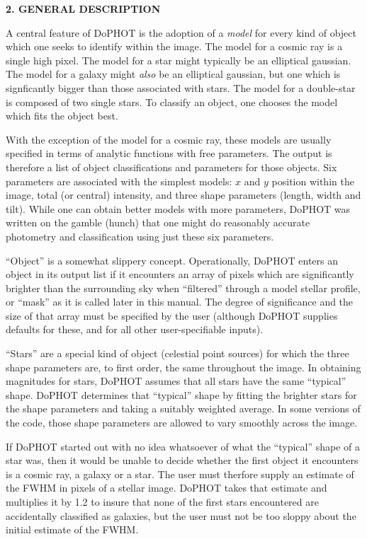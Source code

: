 \centerline{\bf 2.  GENERAL DESCRIPTION}

A central feature of DoPHOT is the adoption of a {\it
model} for every kind of object which one seeks to identify
within the image.  The model for a cosmic ray is a single
high pixel.  The model for a star might typically be an
elliptical gaussian.  The model for a galaxy might {\it
also} be an elliptical gaussian, but one which is
signficantly bigger than those associated with stars.  The
model for a double-star is composed of two single stars.  To
classify an object, one chooses the model which fits the
object best.

With the exception of the model for a cosmic ray, these
models are usually specified in terms of analytic functions with
free parameters.  The output is
therefore a list of object classifications and parameters
for those objects.  Six parameters are associated with the
simplest models: $x$ and $y$ position within the image, total
(or central) intensity, and three shape parameters (length,
width and tilt).  While one can obtain better models with
more parameters, DoPHOT was written on the gamble (hunch)
that one might do reasonably accurate photometry and
classification using just these six parameters.

``Object'' is a somewhat slippery concept.  Operationally,
DoPHOT enters an object in its output list if it encounters
an array of pixels which are significantly brighter than the
surrounding sky when ``filtered'' through a model stellar
profile, or ``mask'' as it is called later in this manual.
The degree of significance and the size of that
array must be specified by the user (although DoPHOT
supplies defaults for these, and for all other user-specifiable inputs).

``Stars'' are a special kind of object (celestial point
sources) for which the three shape parameters are, to first
order, the same throughout the image.  In obtaining
magnitudes for stars, DoPHOT assumes that all stars have the
same ``typical'' shape.  DoPHOT determines that ``typical''
shape by fitting the brighter stars for the shape parameters
and taking a suitably weighted average.  In some versions of the code,
those shape parameters are allowed to vary smoothly across
the image.

If DoPHOT started out with no idea whatsoever of what the
``typical'' shape of a star was, then it would be unable to
decide whether the first object it encounters is a cosmic
ray, a galaxy or a star.  The user must therfore supply an
estimate of the FWHM in pixels of a stellar image.  DoPHOT
takes that estimate and multiplies it by 1.2 to insure that
none of the first stars encountered are accidentally
classified as galaxies, but the user must not be too sloppy
about the initial estimate of the FWHM.

